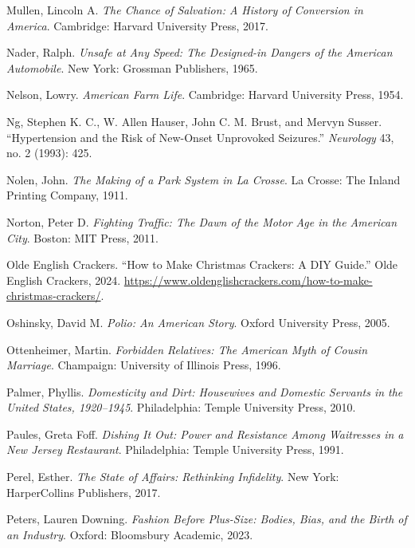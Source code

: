 \documentclass[
  american,
  letterpaper,
]{book}
\newlength{\cslhangindent}
\newenvironment{CSLReferences}[2] %
 {\begin{list}{}{%
  \setlength{\itemindent}{0pt}
  \setlength{\leftmargin}{0pt}
  \setlength{\parsep}{0pt}
  \ifodd #1
   \setlength{\leftmargin}{\cslhangindent}
   \setlength{\itemindent}{-1\cslhangindent}
  \fi
  \setlength{\itemsep}{#2\baselineskip}}}
 {\end{list}}
\begin{document}
\begin{CSLReferences}{1}{0}
Mullen, Lincoln A. \emph{The Chance of Salvation: A History of
Conversion in America}. Cambridge: Harvard University Press, 2017.

Nader, Ralph. \emph{Unsafe at Any Speed: The Designed-in Dangers of the
American Automobile}. New York: Grossman Publishers, 1965.

Nelson, Lowry. \emph{American Farm Life}. Cambridge: Harvard University
Press, 1954.

Ng, Stephen K. C., W. Allen Hauser, John C. M. Brust, and Mervyn Susser.
{``Hypertension and the Risk of New-Onset Unprovoked Seizures.''}
\emph{Neurology} 43, no. 2 (1993): 425.

Nolen, John. \emph{The Making of a Park System in La Crosse}. La Crosse:
The Inland Printing Company, 1911.

Norton, Peter D. \emph{Fighting Traffic: The Dawn of the Motor Age in
the American City}. Boston: MIT Press, 2011.

Olde English Crackers. {``How to Make Christmas Crackers: A DIY
Guide.''} Olde English Crackers, 2024.
\url{https://www.oldenglishcrackers.com/how-to-make-christmas-crackers/}.

Oshinsky, David M. \emph{Polio: An American Story}. Oxford University
Press, 2005.

Ottenheimer, Martin. \emph{Forbidden Relatives: The American Myth of
Cousin Marriage}. Champaign: University of Illinois Press, 1996.

Palmer, Phyllis. \emph{Domesticity and Dirt: Housewives and Domestic
Servants in the United States, 1920--1945}. Philadelphia: Temple
University Press, 2010.

Paules, Greta Foff. \emph{Dishing It Out: Power and Resistance Among
Waitresses in a New Jersey Restaurant}. Philadelphia: Temple University
Press, 1991.

Perel, Esther. \emph{The State of Affairs: Rethinking Infidelity}. New
York: HarperCollins Publishers, 2017.

Peters, Lauren Downing. \emph{Fashion Before Plus-Size: Bodies, Bias,
and the Birth of an Industry}. Oxford: Bloomsbury Academic, 2023.


\end{CSLReferences}
\end{document}
